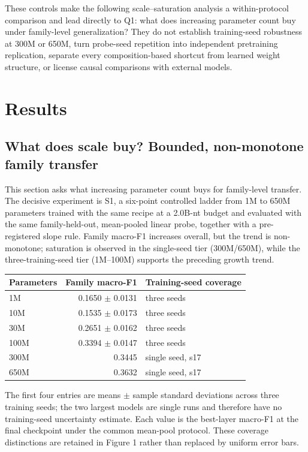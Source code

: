 These controls make the following scale--saturation analysis a within-protocol comparison and lead directly to Q1: what does increasing parameter count buy under family-level generalization? They do not establish training-seed robustness at 300M or 650M, turn probe-seed repetition into independent pretraining replication, separate every composition-based shortcut from learned weight structure, or license causal comparisons with external models.

\section{Results}\label{results}

\hypertarget{what-does-scale-buy-bounded-non-monotone-family-transfer}{%
\subsection{What does scale buy? Bounded, non-monotone family transfer}\label{what-does-scale-buy-bounded-non-monotone-family-transfer}}

This section asks what increasing parameter count buys for family-level transfer. The decisive experiment is S1, a six-point controlled ladder from 1M to 650M parameters trained with the same recipe at a 2.0B-nt budget and evaluated with the same family-held-out, mean-pooled linear probe, together with a pre-registered slope rule. Family macro-F1 increases overall, but the trend is non-monotone; saturation is observed in the single-seed tier (300M/650M), while the three-training-seed tier (1M--100M) supports the preceding growth trend.

\begin{longtable}[]{@{}lrl@{}}
\toprule
Parameters & Family macro-F1 & Training-seed coverage \\
\midrule
\endhead
1M & 0.1650 \(\pm\) 0.0131 & three seeds \\
10M & 0.1535 \(\pm\) 0.0173 & three seeds \\
30M & 0.2651 \(\pm\) 0.0162 & three seeds \\
100M & 0.3394 \(\pm\) 0.0147 & three seeds \\
300M & 0.3445 & single seed, s17 \\
650M & 0.3632 & single seed, s17 \\
\bottomrule
\end{longtable}

The first four entries are means \(\pm\) sample standard deviations across three training seeds; the two largest models are single runs and therefore have no training-seed uncertainty estimate. Each value is the best-layer macro-F1 at the final checkpoint under the common mean-pool protocol. These coverage distinctions are retained in Figure 1 rather than replaced by uniform error bars.

